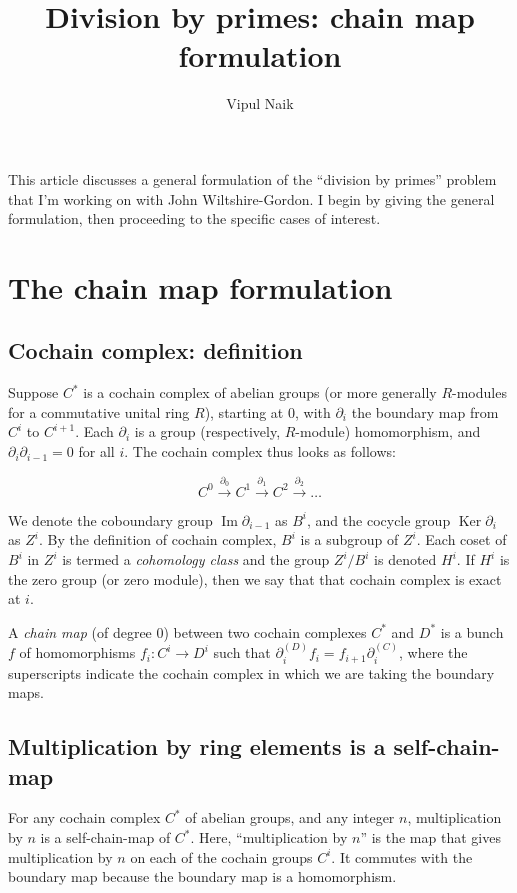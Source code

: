 \documentclass[10pt]{amsart}
\title{Division by primes: chain map formulation}
\author{Vipul Naik}
\begin{document}
\maketitle

This article discusses a general formulation of the ``division by
primes'' problem that I'm working on with John Wiltshire-Gordon. I
begin by giving the general formulation, then proceeding to the
specific cases of interest.

\section{The chain map formulation}

\subsection{Cochain complex: definition}
Suppose $C^*$ is a cochain complex of abelian groups (or more
generally $R$-modules for a commutative unital ring $R$), starting at
$0$, with $\partial_i$ the boundary map from $C^i$ to $C^{i+1}$. Each
$\partial_i$ is a group (respectively, $R$-module) homomorphism, and
$\partial_i\partial_{i-1} = 0$ for all $i$. The cochain complex thus
looks as follows:

$$C^0 \stackrel{\partial_0}{\to} C^1 \stackrel{\partial_1}{\to} C^2\stackrel{\partial_2}{\to} \dots$$

We denote the coboundary group $\operatorname{Im} \partial_{i-1}$ as
$B^i$, and the cocycle group $\operatorname{Ker} \partial_i$ as
$Z^i$. By the definition of cochain complex, $B^i$ is a subgroup of
$Z^i$. Each coset of $B^i$ in $Z^i$ is termed a {\em cohomology class}
and the group $Z^i/B^i$ is denoted $H^i$. If $H^i$ is the zero group
(or zero module), then we say that that cochain complex is exact at $i$.

A {\em chain map} (of degree $0$) between two cochain complexes $C^*$
and $D^*$ is a bunch $f$ of homomorphisms $f_i: C^i \to D^i$ such that
$\partial^{(D)}_if_i = f_{i+1}\partial^{(C)}_i$, where the
superscripts indicate the cochain complex in which we are taking the
boundary maps.

\subsection{Multiplication by ring elements is a self-chain-map}

For any cochain complex $C^*$ of abelian groups, and any integer $n$,
multiplication by $n$ is a self-chain-map of $C^*$. Here,
``multiplication by $n$'' is the map that gives multiplication by $n$
on each of the cochain groups $C^i$. It commutes with the boundary map
because the boundary map is a homomorphism.
\end{document}
